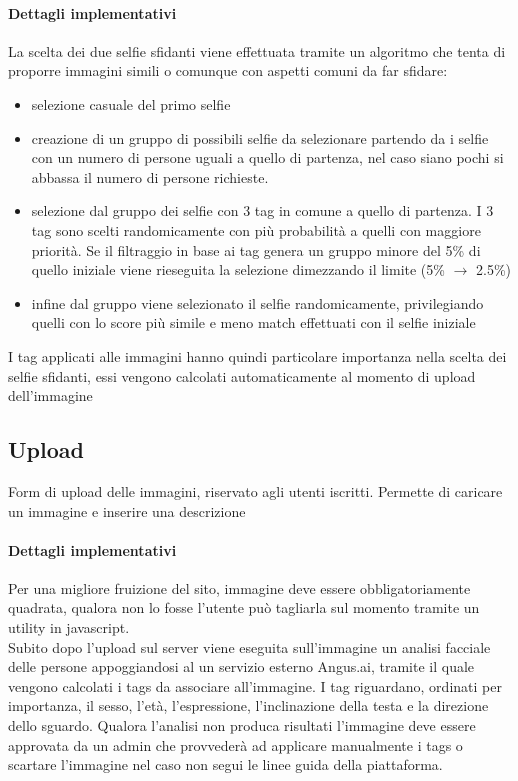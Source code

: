 \documentclass{article}
\begin{document}
\paragraph{Dettagli implementativi}
La scelta dei due selfie sfidanti viene effettuata tramite un algoritmo che tenta di proporre immagini simili o comunque con aspetti comuni da far sfidare:
\begin{itemize}
\item selezione casuale del primo selfie
\item creazione di un gruppo di possibili selfie da selezionare partendo da i selfie con un numero di persone uguali a quello di partenza, nel caso siano pochi si abbassa il numero di persone richieste.
\item selezione dal gruppo dei selfie con 3 tag in comune a quello di partenza. I 3 tag sono scelti randomicamente con più probabilità a quelli con maggiore priorità. Se il filtraggio in base ai tag genera un gruppo minore del 5\% di quello iniziale viene rieseguita la selezione dimezzando il limite (5\% $\to$ 2.5\%)
\item infine dal gruppo viene selezionato il selfie randomicamente, privilegiando quelli con lo score più simile e meno match effettuati con il selfie iniziale
\end{itemize}
I tag applicati alle immagini hanno quindi particolare importanza nella scelta dei selfie sfidanti, essi vengono calcolati automaticamente al momento di upload dell'immagine

\subsection{Upload}
Form di upload delle immagini, riservato agli utenti iscritti.
Permette di caricare un immagine e inserire una descrizione\\

\paragraph{Dettagli implementativi}
Per una migliore fruizione del sito, immagine deve essere obbligatoriamente quadrata, qualora non lo fosse l'utente può tagliarla sul momento tramite un utility in javascript.\\
Subito dopo l'upload sul server viene eseguita sull'immagine un analisi facciale delle persone appoggiandosi al un servizio esterno Angus.ai, tramite il quale vengono calcolati i tags da associare all'immagine.
I tag riguardano, ordinati per importanza, il sesso, l'età, l'espressione, l'inclinazione della testa e la direzione dello sguardo.
Qualora l'analisi non produca risultati l'immagine deve essere approvata da un admin che provvederà ad applicare manualmente i tags o scartare l'immagine nel caso non segui le linee guida della piattaforma.
\end{document}

